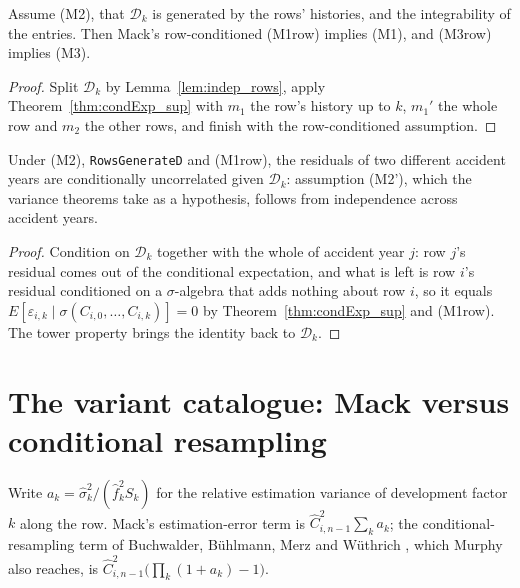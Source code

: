 \begin{theorem}\label{thm:passage}\leanok
{}
Assume (M2), that $\mathcal{D}_k$ is generated by the rows' histories, and the integrability of the
entries. Then Mack's row-conditioned (M1row) implies (M1), and (M3row) implies (M3).
\end{theorem}
\begin{proof}\leanok Split $\mathcal{D}_k$ by Lemma~\ref{lem:indep_rows}, apply
Theorem~\ref{thm:condExp_sup} with $m_1$ the row's history up to $k$, $m_1'$ the whole row and
$m_2$ the other rows, and finish with the row-conditioned assumption. \end{proof}

\begin{theorem}\label{thm:mack2prime}\leanok
{}
Under (M2), \texttt{RowsGenerateD} and (M1row), the residuals of two different accident years are
conditionally uncorrelated given $\mathcal{D}_k$: assumption (M2'), which the variance theorems
take as a hypothesis, follows from independence across accident years.
\end{theorem}
\begin{proof}\leanok Condition on $\mathcal{D}_k$ together with the whole of accident year $j$:
row $j$'s residual comes out of the conditional expectation, and what is left is row $i$'s
residual conditioned on a $\sigma$-algebra that adds nothing about row $i$, so it equals
$E[\varepsilon_{i,k} \mid \sigma(C_{i,0},\dots,C_{i,k})] = 0$ by
Theorem~\ref{thm:condExp_sup} and (M1row). The tower property brings the identity back to
$\mathcal{D}_k$. \end{proof}

\chapter{The variant catalogue: Mack versus conditional resampling}

Write $a_k = \hat\sigma_k^2/(\hat f_k^2 S_k)$ for the relative estimation variance of
development factor $k$ along the row. Mack's estimation-error term is
$\hat C_{i,n-1}^2\sum_k a_k$; the conditional-resampling term of Buchwalder, Bühlmann,
Merz and Wüthrich \cite{BBMW2006}, which Murphy \cite{Murphy1994} also reaches, is
$\hat C_{i,n-1}^2\big(\prod_k (1+a_k) - 1\big)$.

